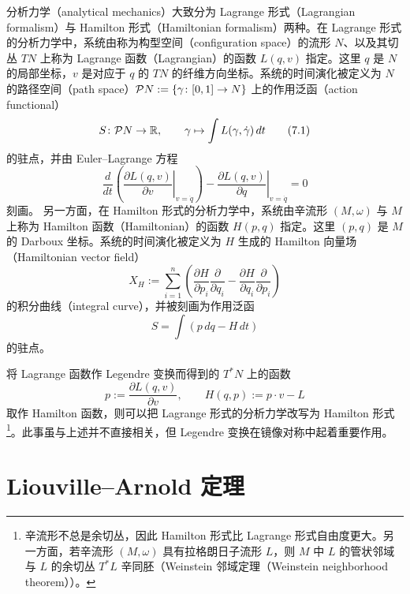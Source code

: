分析力学（analytical mechanics）大致分为 Lagrange 形式（Lagrangian formalism）与 Hamilton 形式（Hamiltonian formalism）两种。在 Lagrange 形式的分析力学中，系统由称为构型空间（configuration space）的流形 $N$、以及其切丛 $TN$ 上称为 Lagrange 函数（Lagrangian）的函数 $L(q,v)$ 指定。这里 $q$ 是 $N$ 的局部坐标，$v$ 是对应于 $q$ 的 $TN$ 的纤维方向坐标。系统的时间演化被定义为 $N$ 的路径空间（path space）$\mathcal{P} N:=\{\gamma\colon[0,1]\to N\}$ 上的作用泛函（action functional）
\begin{equation}
    S\colon\mathcal{P} N\to\mathbb{R},\qquad \gamma\mapsto\int L(\gamma,\dot\gamma)\,dt \tag{7.1}
\end{equation}
的驻点，并由 Euler–Lagrange 方程
\begin{equation}
    \frac{d}{dt}\left(\left.\frac{\partial L(q,v)}{\partial v}\right|_{v=\dot q}\right)-\left.\frac{\partial L(q,v)}{\partial q}\right|_{v=\dot q}=0 \tag{7.2}
\end{equation}
刻画。%
另一方面，在 Hamilton 形式的分析力学中，系统由辛流形 $(M,\omega)$ 与 $M$ 上称为 Hamilton 函数（Hamiltonian）的函数 $H(p,q)$ 指定。这里 $(p,q)$ 是 $M$ 的 Darboux 坐标。系统的时间演化被定义为 $H$ 生成的 Hamilton 向量场（Hamiltonian vector field）
\begin{equation}
    X_H:=\sum_{i=1}^{n}\left(\frac{\partial H}{\partial p_i}\frac{\partial}{\partial q_i}-\frac{\partial H}{\partial q_i}\frac{\partial}{\partial p_i}\right) \tag{7.3}
\end{equation}
的积分曲线（integral curve），并被刻画为作用泛函
\begin{equation}
    S=\int (p\,dq-H\,dt) \tag{7.4}
\end{equation}
的驻点。

将 Lagrange 函数作 Legendre 变换而得到的 $T^*N$ 上的函数
\begin{equation}
    p:=\frac{\partial L(q,v)}{\partial v},\qquad H(q,p):=p\cdot v-L \tag{7.5}
\end{equation}
取作 Hamilton 函数，则可以把 Lagrange 形式的分析力学改写为 Hamilton 形式\footnote{辛流形不总是余切丛，因此 Hamilton 形式比 Lagrange 形式自由度更大。另一方面，若辛流形 $(M,\omega)$ 具有拉格朗日子流形 $L$，则 $M$ 中 $L$ 的管状邻域与 $L$ 的余切丛 $T^*L$ 辛同胚（Weinstein 邻域定理（Weinstein neighborhood theorem））。}。此事虽与上述并不直接相关，但 Legendre 变换在镜像对称中起着重要作用。

\section{Liouville–Arnold 定理}

